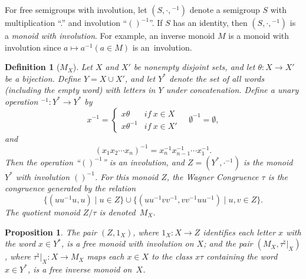\documentclass{surv-l}
\numberwithin{equation}{section}
\numberwithin{table}{section}
\numberwithin{figure}{section}
\theoremstyle{plain}
\newtheorem{proposition}[equation]{Proposition}
\newtheorem{definition}[equation]{Definition}
\theoremstyle{definition}
\begin{document}
For free semigroups with involution, let $(S,\cdot,{}^{-1})$ denote a semigroup $S$ with
multiplication ``.'' and involution ``$()^{-1}$''. If $S$ has an
identity, then $(S,\cdot,{}^{-1})$ is a \emph{monoid with
involution}. For example, an inverse monoid $M$ is a monoid with
involution since $a\mapsto a^{-1}(a\in M)$ is an~involution.

\begin{definition}[$M_{X}$]\label{defn42.5}
Let $X$ and $X'$ be nonempty disjoint sets, and let $\theta :
X\rightarrow X'$ be a bijection. Define $Y=X\cup X'$, and let
$Y^{\ast}$ denote the set of all words (including the empty word)
with letters in $Y$ under concatenation. Define a unary operation
${}^{-1}:Y^{\ast}\rightarrow Y^{\ast}$ by
\[
x^{-1}=\begin{cases}
x\theta &if\ x\in X\\
x\theta^{-1} &if\ x\in X'
\end{cases}\quad \emptyset^{-1}=\emptyset,
\]
and
\[
(x_{1}x_{2}\cdots x_{n})^{-1}=x_{n}^{-1}x_{n-1}^{-1}\cdots x_{1}^{-1}.
\]
Then the operation ``$()^{-1}$'' is an involution, and
$Z=(Y^{\ast},\cdot{}^{-1})$ is the monoid $Y^{\ast}$ with
involution $()^{-1}$. For this monoid $Z$, the Wagner
Congruence $\tau$ is the congruence
generated by the relation
\[
\{(uu^{-1}u, u)\mid u\in Z\} \cup \{(uu^{-1}vv^{-1},
vv^{-1}uu^{-1})\mid u, v\in Z\}.
\]
The quotient monoid $Z/\tau$ is denoted~$M_{X}$.
\end{definition}

\begin{proposition}\label{prop9.42.6}
The pair $(Z,1_{X})$, where $1_{X} : X\rightarrow Z$ identifies
each letter $x$ with the word $x\in Y^{\ast}$, is a free monoid
with involution on $X$; and the pair $(M_{X},
\tau^{\natural}|_{X})$, where $\tau^{\natural}|_{X} :
X\rightarrow M_{X}$ maps each $x\in X$ to the class $ x\tau$
containing the word $x\in Y^{\ast}$, is a free inverse
monoid on~$X$.
\end{proposition}
\end{document}
